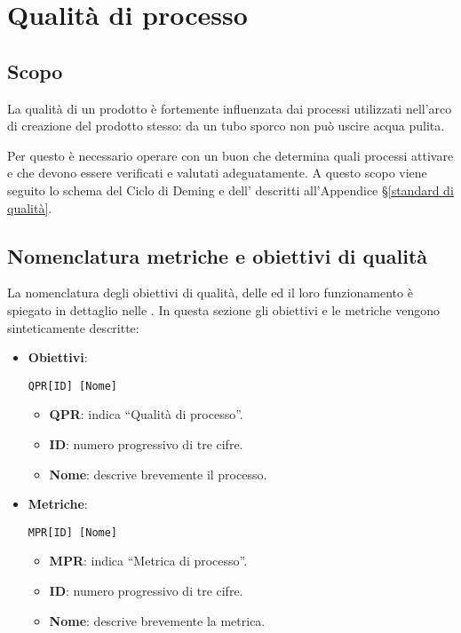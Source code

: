 \section{Qualità di processo}\label{qualità di processo}

\subsection{Scopo}
La qualità di un prodotto è fortemente influenzata dai processi utilizzati nell'arco di creazione del prodotto stesso: da un tubo sporco non può uscire acqua pulita.

Per questo è necessario operare con un buon  che
determina quali processi attivare e che devono essere verificati e valutati adeguatamente. A questo scopo viene seguito lo schema del Ciclo di Deming e dell' descritti all'Appendice \S\ref{standard di qualità}.

\subsection{Nomenclatura metriche e obiettivi di qualità}  \label{nomenclatura}
La nomenclatura degli obiettivi di qualità, delle  ed il loro funzionamento è spiegato in dettaglio nelle \NdP. In questa sezione gli obiettivi e le metriche vengono sinteticamente descritte:

	\begin{itemize}
		\item \textbf{Obiettivi}:

		\begin{center}
			\texttt{QPR[ID] [Nome]}
		\end{center}

		\begin{itemize}
			\item \textbf{QPR}: indica ``Qualità di processo''.
			\item \textbf{ID}: numero progressivo di tre cifre.
			\item \textbf{Nome}: descrive brevemente il processo.
		\end{itemize}

		\item \textbf{Metriche}:

		\begin{center}
			\texttt{MPR[ID] [Nome]}
		\end{center}

		\begin{itemize}
			\item \textbf{MPR}: indica ``Metrica di processo''.
			\item \textbf{ID}: numero progressivo di tre cifre.
			\item \textbf{Nome}: descrive brevemente la metrica.
		\end{itemize}

	\end{itemize}





